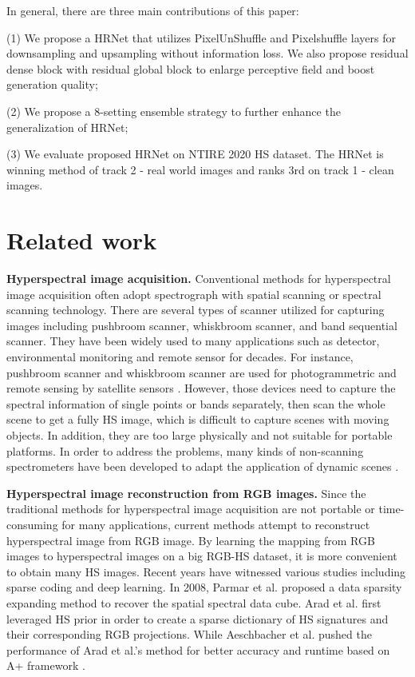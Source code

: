 \documentclass[10pt,twocolumn,letterpaper]{article}
\begin{document}
In general, there are three main contributions of this paper:

(1) We propose a HRNet that utilizes PixelUnShuffle and Pixelshuffle layers for downsampling and upsampling without information loss. We also propose residual dense block with residual global block to enlarge perceptive field and boost generation quality;

(2) We propose a 8-setting ensemble strategy to further enhance the generalization of HRNet;

(3) We evaluate proposed HRNet on NTIRE 2020 HS dataset. The HRNet is winning method of track 2 - real world images and ranks 3rd on track 1 - clean images.

\section{Related work}

\textbf{Hyperspectral image acquisition.} Conventional methods for hyperspectral image acquisition often adopt spectrograph with spatial scanning or spectral scanning technology. There are several types of scanner utilized for capturing images including pushbroom scanner, whiskbroom scanner, and band sequential scanner. They have been widely used to many applications such as detector, environmental monitoring and remote sensor for decades. For instance, pushbroom scanner and whiskbroom scanner are used for photogrammetric and remote sensing by satellite sensors \cite{poli2012review, breuer2000geometric}. However, those devices need to capture the spectral information of single points or bands separately, then scan the whole scene to get a fully HS image, which is difficult to capture scenes with moving objects. In addition, they are too large physically and not suitable for portable platforms. In order to address the problems, many kinds of non-scanning spectrometers have been developed to adapt the application of dynamic scenes \cite{descour1995computed, cao2011prism, wang2016adaptive}.

\textbf{Hyperspectral image reconstruction from RGB images.} Since the traditional methods for hyperspectral image acquisition are not portable or time-consuming for many applications, current methods attempt to reconstruct hyperspectral image from RGB image. By learning the mapping from RGB images to hyperspectral images on a big RGB-HS dataset, it is more convenient to obtain many HS images. Recent years have witnessed various studies including sparse coding and deep learning. In 2008, Parmar et al. \cite{parmar2008spatio} proposed a data sparsity expanding method to recover the spatial spectral data cube. Arad et al. \cite{arad2016sparse} first leveraged HS prior in order to create a sparse dictionary of HS signatures and their corresponding RGB projections. While Aeschbacher et al. \cite{aeschbacher2017defense} pushed the performance of Arad et al.'s method for better accuracy and runtime based on A+ framework \cite{timofte2014a+}.
\end{document}

